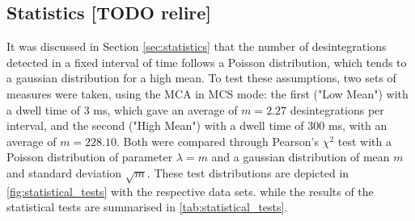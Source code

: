 \subsection{Statistics [TODO relire]}
It was discussed in Section \ref{sec:statistics} that the number of desintegrations detected 
in a fixed interval of time follows a Poisson distribution, which tends to 
a gaussian distribution for a high mean.
To test these assumptions, two sets of measures were taken, using the MCA in MCS mode: 
the first ("Low Mean") with a dwell time of $3$ ms, which gave an average of $m = 2.27$ desintegrations per interval, 
and the second ("High Mean") with a dwell time of $300$ ms, with an average of $m = 228.10$.
Both were compared through Pearson's $\chi^2$ test 
with a Poisson distribution of parameter $\lambda = m$ 
and a gaussian distribution of mean $m$ and standard deviation $\sqrt{m}$.
These test distributions are depicted in \autoref{fig:statistical_tests} with
the respective data sets.
while the results of the statistical tests are summarised in \autoref{tab:statistical_tests}.
%
